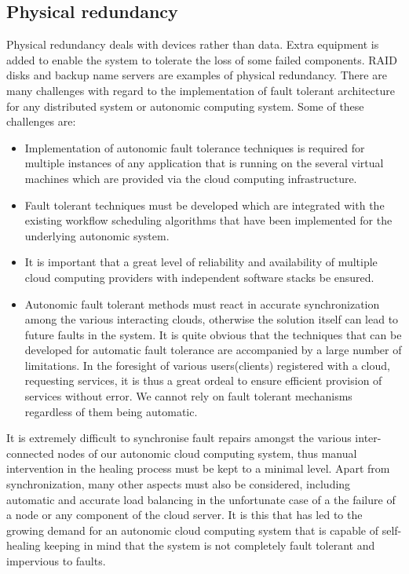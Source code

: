 \subsection{Physical redundancy}
Physical redundancy deals with devices rather than data. Extra equipment is added to enable the system to tolerate the loss of some failed components. RAID disks and backup name servers are examples of physical redundancy. 
There are many challenges with regard to the implementation of fault tolerant architecture for any distributed system or autonomic computing system. Some of these challenges are:
	\begin{itemize}
		\item Implementation of autonomic fault tolerance techniques is required for multiple instances of any application that is running on the several virtual machines which are provided via the cloud computing infrastructure.
		\item Fault tolerant techniques must be developed which are integrated with the existing workflow scheduling algorithms that have been implemented for the underlying autonomic system.
		\item It is important that a great level of reliability and availability of multiple cloud computing providers with independent software stacks be ensured. 
		\item Autonomic fault tolerant methods must react in accurate synchronization among the various interacting clouds, otherwise the solution itself can lead to future faults in the system.
It is quite obvious that the techniques that can be developed for automatic fault tolerance are accompanied by a large number of limitations. In the foresight of various users(clients) registered with a cloud, requesting services, it is thus a great ordeal to ensure efficient provision of services without error. We cannot rely on fault tolerant mechanisms regardless of them being automatic.
	\end{itemize}
It is extremely difficult to synchronise fault repairs amongst the various inter-connected nodes of our autonomic cloud computing system, thus manual intervention in the healing process must be kept to a minimal level. Apart from synchronization, many other aspects must also be considered, including automatic and accurate load balancing in the unfortunate case of a the failure of a node or any component of the cloud server. It is this that has led to the growing demand for an autonomic cloud computing system that is capable of self- healing keeping in mind that the system is not completely fault tolerant and impervious to faults.
